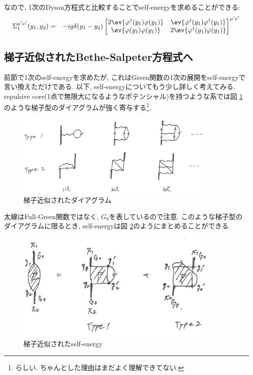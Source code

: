 \documentclass[10.5pt,a4paper]{jreport}
\begin{document}
なので, 1次のDyson方程式と比較することでself-energyを求めることができる:
\begin{eqnarray}
  \Sigma^{\mu'\nu'}_1(y_1, y_2) &=& -ig\delta(y_1-y_2)
  \begin{bmatrix}
    2\ev{\varphi^\dagger(y_1)\varphi(y_1)}&\ev{\varphi^\dagger(y_1)\varphi^\dagger(y_1)}\\
    \ev{\varphi(y_1)\varphi(y_1)}&2\ev{\varphi^\dagger(y_1)\varphi(y_1)}
  \end{bmatrix}^{\mu'\nu'}\label{1st-self-energy}
\end{eqnarray}
\subsection{梯子近似されたBethe-Salpeter方程式へ}
前節で1次のself-energyを求めたが, これはGreen関数の1次の展開をself-energyで言い換えただけである. 以下, self-energyについてもう少し詳しく考えてみる.
repulsive core(1点で無限大になるようなポテンシャル)を持つような系では図 \ref{ladder1}のような梯子型のダイアグラムが強く寄与する\footnote{らしい. ちゃんとした理由はまだよく理解できてない. }.
\begin{figure}[htbp]
  \begin{center}
    \includegraphics[width = 10cm]{./EPS/ladder1.eps}
  \end{center}
  \caption{梯子近似されたダイアグラム}\label{ladder1}
\end{figure}
太線はFull-Green関数ではなく, $G_0$を表しているので注意. このような梯子型のダイアグラムに限るとき, self-energyは図 \ref{ladder2}のようにまとめることができる.
\begin{figure}[htbp]
  \begin{center}
    \includegraphics[width = 10cm]{./EPS/ladder2.eps}
  \end{center}
  \caption{梯子近似されたself-energy}\label{ladder2}
\end{figure}
\end{document}
